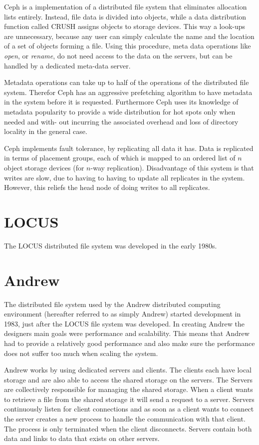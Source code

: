 \documentclass[a4paper,12px]{article}
\begin{document}
Ceph is a implementation of a distributed file system that eliminates allocation
lists entirely. Instead, file data is divided into objects, while a data
distribution function called CRUSH assigns objects to storage devices. This way
a look-ups are unnecessary, because any user can simply calculate the name and
the location of a set of objects forming a file.  Using this procedure,
meta data operations like \textit{open}, or \textit{rename}, do not need access
to the data on the servers, but can be handled by a dedicated meta-data server.

Metadata operations can take up to half of the operations of the distributed
file system. Therefor Ceph has an aggressive prefetching algorithm to have
metadata in the system before it is requested.  Furthermore Ceph uses its
knowledge of metadata popularity to provide a wide distribution for hot spots
only when needed and with- out incurring the associated overhead and loss of
directory locality in the general case.

Ceph implements fault tolerance, by replicating all data it has. Data is
replicated in terms of placement groups, each of which is mapped to an ordered
list of $n$ object storage devices (for $n$-way replication). Disadvantage of
this system is that writes are slow, due to having to having to update all
replicates in the system. However, this reliefs the head node of doing writes to
all replicates.


\section{LOCUS}
The LOCUS distributed file system was developed in the early 1980s.

\section{Andrew}

The distributed file system used by the Andrew distributed computing environment
(hereafter referred to as simply Andrew) started development in 1983, just after
the LOCUS file system was developed. In creating Andrew the designers main goals
were performance and scalability. This means that Andrew had to provide a
relatively good performance and also make sure the performance does not suffer
too much when scaling the system.\cite{andrew}

Andrew works by using dedicated servers and clients. The clients each have local
storage and are also able to access the shared storage on the servers. The
Servers are collectively responsible for managing the shared
storage.\cite{concepts} When a client wants to retrieve a file from the shared
storage it will send a request to a server. Servers continuously listen for
client connections and as soon as a client wants to connect the server creates a
new process to handle the communication with that client. The process is only
terminated when the client disconnects.\cite{andrew} Servers contain both data
and links to data that exists on other servers.
\end{document}

